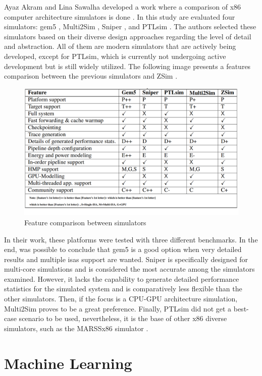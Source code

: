 Ayaz Akram and Lina Sawalha developed a work where a comparison of x86 computer architecture simulators is done \cite{akram2016comparison}. In this study are evaluated four simulators: gem5 \cite{TheGem5Simulator}, Multi2Sim \cite{ubal2012multi2sim}, Sniper \cite{carlson2011sniper}, and PTLsim \cite{yourst2007ptlsim}. The authors selected these simulators based on their diverse design approaches regarding the level of detail and abstraction. All of them are modern simulators that are actively being developed, except for PTLsim, which is currently not undergoing active development but is still widely utilized. The following image presents a features comparison between the previous simulators and ZSim \cite{sanchez2013zsim}. 

\begin{figure}[H]
	\centering
 	\includegraphics[width=0.7\linewidth]{Images/ComparationTableSimulators.png}
 	\caption{Feature comparison between simulators \cite{akram2016comparison}}
	 \label{fig_ComparationTableSimulators}
\end{figure}

In their work, these platforms were tested with three different benchmarks. In the end, was possible to conclude that gem5 is a good option when very detailed results and multiple \glspl{isa} support are wanted. Sniper is specifically designed for multi-core simulations and is considered the most accurate among the simulators examined. However, it lacks the capability to generate detailed performance statistics for the simulated system and is comparatively less flexible than the other simulators. Then, if the focus is a CPU-GPU architecture simulation, Multi2Sim proves to be a great preference. Finally, PTLsim did not get a best-case scenario to be used, nevertheless, it is the base of other x86 diverse simulators, such as the MARSSx86 simulator \cite{patel2011marss}.

\section{Machine Learning}

